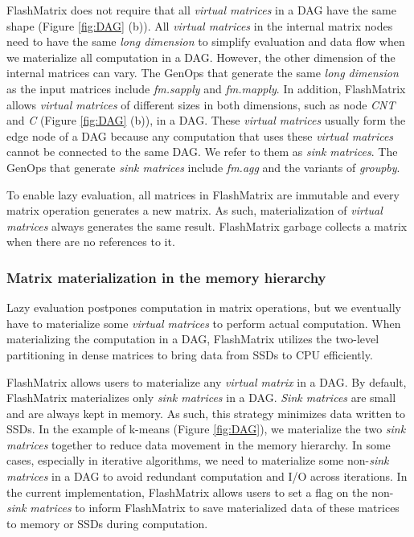 FlashMatrix does not require that all \textit{virtual matrices} in a DAG have
the same shape (Figure \ref{fig:DAG} (b)). All \textit{virtual matrices} in
the internal matrix nodes need to have the same \textit{long dimension} to
simplify evaluation and data flow when we materialize all computation in a DAG.
However, the other dimension of the internal matrices can vary. The GenOps
that generate the same \textit{long dimension} as the input matrices include
\textit{fm.sapply} and \textit{fm.mapply}. In addition, FlashMatrix allows
\textit{virtual matrices} of different sizes in both dimensions, such as
node \textit{CNT} and \textit{C} (Figure \ref{fig:DAG} (b)), in a DAG.
These \textit{virtual matrices} usually form the edge node of a DAG because
any computation that uses these \textit{virtual matrices} cannot be connected
to the same DAG.  We refer to them as \textit{sink matrices}. The GenOps that
generate \textit{sink matrices} include \textit{fm.agg} and the variants of
\textit{groupby}.

To enable lazy evaluation, all matrices in FlashMatrix are immutable and every
matrix operation generates a new matrix. As such, materialization of
\textit{virtual matrices} always generates the same result. FlashMatrix
garbage collects a matrix when there are no references to it.

\subsubsection{Matrix materialization in the memory hierarchy} \label{sec:materialize}
Lazy evaluation postpones computation in matrix operations, but we eventually
have to materialize some \textit{virtual matrices} to perform actual computation.
When materializing the computation in a DAG, FlashMatrix utilizes the two-level
partitioning in dense matrices to bring data from SSDs to CPU efficiently.

FlashMatrix allows users to materialize any \textit{virtual matrix} in a DAG.
By default, FlashMatrix
materializes only \textit{sink matrices} in a DAG. \textit{Sink matrices}
are small and are always kept in memory. As such, this strategy minimizes
data written to SSDs. In the example of k-means (Figure \ref{fig:DAG}),
we materialize the two \textit{sink matrices} together to reduce data movement
in the memory hierarchy. In some cases, especially in iterative algorithms,
we need to materialize some non-\textit{sink matrices} in a DAG to avoid
redundant computation and I/O across iterations. In the current implementation,
FlashMatrix allows users to set a flag on the
non-\textit{sink matrices} to inform FlashMatrix to save materialized data
of these matrices to memory or SSDs during computation.

